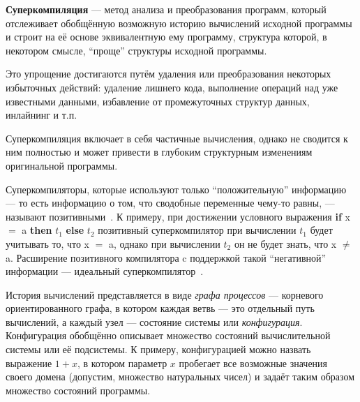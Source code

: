 {\bf Суперкомпиляция} --- метод анализа и преобразования программ,
который отслеживает обобщённую возможную историю вычислений исходной программы и строит
на её основе эквивалентную ему программу, структура которой, в некотором смысле, ``проще''
структуры исходной программы\cite{turchinSC}. %

Это упрощение достигаются путём удаления или преобразования
некоторых избыточных действий: удаление лишнего кода, выполнение операций над
уже известными данными, избавление от промежуточных структур данных, инлайнинг и т.п.

Суперкомпиляция включает в себя частичные вычисления, однако не сводится к ним полностью
и может привести в глубоким структурным изменениям оригинальной программы.

Суперкомпиляторы, которые используют только ``положительную'' информацию
--- то есть информацию о том, что сводобные переменные чему-то равны, ---
называют позитивными~\cite{scPos}.
К примеру, при достижении условного выражения {\bf if} x $=$ a {\bf then} $t_1$ {\bf else} $t_2$
позитивный суперкомпилятор при вычислении $t_1$ будет учитывать то, что x $=$ a,
однако при вычислении $t_2$ он не будет знать, что x $\neq$ a.
Расширение позитивного компилятора c поддержкой такой ``негативной'' информации --- идеальный
суперкомпилятор~\cite{scPerf}.


История вычислений представляется в виде \emph{графа процессов} --- корневого ориентированного графа,
в котором каждая ветвь --- это отдельный путь вычислений, а каждый узел --- состояние системы или \emph{конфигурация}.
Конфигурация обобщённо описывает множество состояний вычислительной системы или её подсистемы.
К примеру, конфигурацией можно назвать выражение $1 + x$, в котором параметр $x$ пробегает
все возможные значения своего домена (допустим, множество натуральных чисел) и задаёт
таким образом множество состояний программы. 


